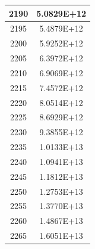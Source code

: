 \documentclass[a4paper]{article}
\begin{document}
\begin{tabular}{| c | c |}
    	2190 & 5.0829E+12 \\\hline
    	2195 & 5.4879E+12 \\\hline
    	2200 & 5.9252E+12 \\\hline
    	2205 & 6.3972E+12 \\\hline
    	2210 & 6.9069E+12 \\\hline
    	2215 & 7.4572E+12 \\\hline
    	2220 & 8.0514E+12 \\\hline
    	2225 & 8.6929E+12 \\\hline
    	2230 & 9.3855E+12 \\\hline
    	2235 & 1.0133E+13 \\\hline
    	2240 & 1.0941E+13 \\\hline
    	2245 & 1.1812E+13 \\\hline
    	2250 & 1.2753E+13 \\\hline
    	2255 & 1.3770E+13 \\\hline
    	2260 & 1.4867E+13 \\\hline
    	2265 & 1.6051E+13 \\\hline
    \end{tabular}
    \hfill
\end{document}
